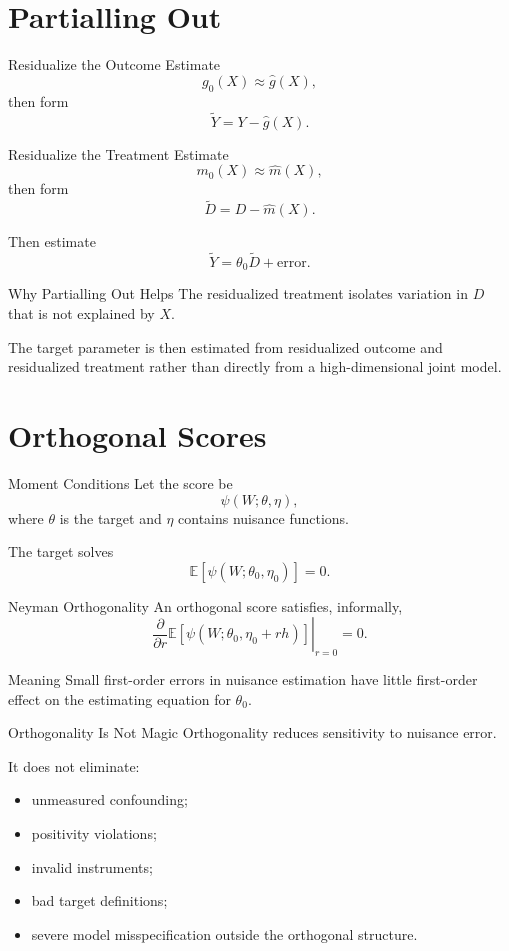 \documentclass[aspectratio=169,11pt]{beamer}
\newcommand{\E}{\mathbb{E}}
\begin{document}
\section{Partialling Out}

\begin{frame}{Residualize the Outcome}
Estimate
\[
g_0(X) \approx \widehat g(X),
\]
then form
\[
\widetilde Y = Y-\widehat g(X).
\]
\end{frame}

\begin{frame}{Residualize the Treatment}
Estimate
\[
m_0(X) \approx \widehat m(X),
\]
then form
\[
\widetilde D = D-\widehat m(X).
\]

Then estimate
\[
\widetilde Y = \theta_0 \widetilde D + \text{error}.
\]
\end{frame}

\begin{frame}{Why Partialling Out Helps}
The residualized treatment isolates variation in \(D\) that is not explained by \(X\).

The target parameter is then estimated from residualized outcome and residualized treatment rather than directly from a high-dimensional joint model.
\end{frame}

\section{Orthogonal Scores}

\begin{frame}{Moment Conditions}
Let the score be
\[
\psi(W;\theta,\eta),
\]
where \(\theta\) is the target and \(\eta\) contains nuisance functions.

The target solves
\[
\E[\psi(W;\theta_0,\eta_0)]=0.
\]
\end{frame}

\begin{frame}{Neyman Orthogonality}
An orthogonal score satisfies, informally,
\[
\left.
\frac{\partial}{\partial r}
\E[
\psi(W;\theta_0,\eta_0+r h)
]
\right|_{r=0}
=0.
\]

\begin{block}{Meaning}
Small first-order errors in nuisance estimation have little first-order effect on the estimating equation for \(\theta_0\).
\end{block}
\end{frame}

\begin{frame}{Orthogonality Is Not Magic}
Orthogonality reduces sensitivity to nuisance error.

It does not eliminate:
\begin{itemize}
\item unmeasured confounding;
\item positivity violations;
\item invalid instruments;
\item bad target definitions;
\item severe model misspecification outside the orthogonal structure.
\end{itemize}
\end{frame}
\end{document}
